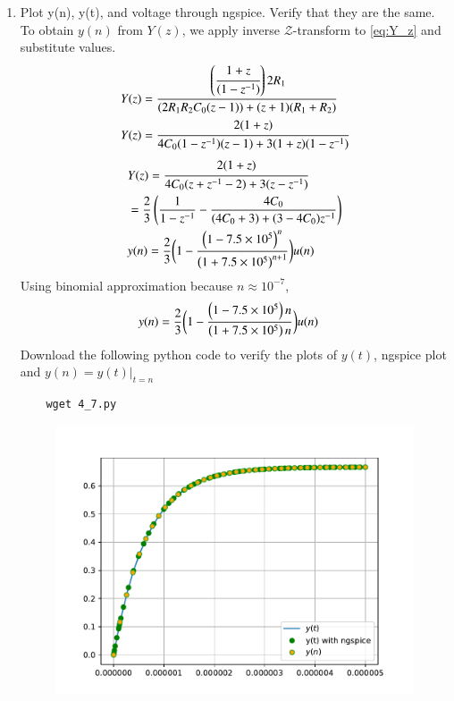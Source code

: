 \documentclass[journal,12pt,twocolumn]{IEEEtran}
\renewcommand\thesection{\arabic{section}}
\begin{document}
\begin{enumerate}[label=\arabic*.,ref=\thesection.\theenumi]
\item Plot y(n), y(t), and voltage through ngspice. Verify that they are the same. \\
\solution
To obtain $y(n)$ from $Y(z)$, we apply inverse $\mathcal{Z}$-transform to \eqref{eq:Y_z} and substitute values.
\begin{align}
	&Y(z) = \cfrac{\left(\cfrac{1 + z}{(1 - z^{-1})}\right) 2 R_1}{(2R_1 R_2 C_0 (z-1)) + (z+1)(R_1 + R_2)} \\
	&Y(z) = \cfrac{2(1+z)}{4 C_0 (1 - z^{-1})(z - 1) + 3 (1 + z)(1 - z^{-1})} 
\end{align}
\begin{align}
	&Y(z) = \cfrac{2(1+z)}{4 C_0 (z + z^{-1} - 2) + 3 (z - z^{-1})}  \\
	&= \frac{2}{3} \left(\frac{1}{1 - z^{-1}} - \frac{4 C_0}{(4C_0 + 3) + (3 - 4C_0)z^{-1}}\right) \\
	&y(n) = \frac{2}{3} \biggl( 1 - \frac{\left(1 - 7.5 \times 10^5\right)^n}{\left(1 + 7.5 \times 10^5\right)^{n+1}} \biggr) u(n)
\end{align}
Using binomial approximation because $n \approx 10^{-7}$,   
\begin{align}
	&y(n) = \frac{2}{3} \biggl( 1 - \frac{\left(1 - 7.5 \times 10^5\right)n}{\left(1 + 7.5 \times 10^5\right){n}} \biggr) u(n) 
\end{align}
Download the following python code to verify the plots of $y(t)$, ngspice plot and $y(n) = y(t) |_{t = n}$
\begin{lstlisting}
	wget 4_7.py
\end{lstlisting}

\begin{figure}[!ht]
\centering
\includegraphics[width=1.0\columnwidth]{./figs/4_7.pdf}
\label{fig-4.7}	
\end{figure}
\end{enumerate}
\end{document}
